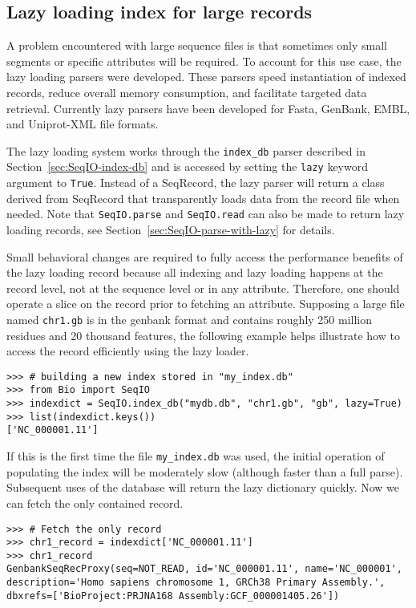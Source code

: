 \documentclass{report}
\begin{document}
\subsection{Lazy loading index for large records}
\label{sec:SeqIO-lazy-index}

A problem encountered with large sequence files is that sometimes only
small segments or specific attributes will be required. To account for
this use case, the lazy loading parsers were developed. These parsers
speed instantiation of indexed records, reduce overall memory consumption,
and facilitate targeted data retrieval. Currently lazy parsers have been
developed for Fasta, GenBank, EMBL, and Uniprot-XML file formats.

The lazy loading system works through the \verb|index_db| parser described
in Section~\ref{sec:SeqIO-index-db} and is accessed by setting the
\verb|lazy| keyword argument to \verb|True|. Instead of a SeqRecord, the lazy
parser will return a class derived from SeqRecord that transparently loads data
from the record file when needed. Note that \verb|SeqIO.parse| and
\verb|SeqIO.read| can also be made to return lazy loading records, see
Section~\ref{sec:SeqIO-parse-with-lazy} for details.

Small behavioral changes are required to fully access the performance benefits
of the lazy loading record because all indexing and lazy loading happens at
the record level, not at the sequence level or in any attribute. Therefore, one
should operate a slice on the record prior to fetching an attribute. Supposing
a large file named \verb|chr1.gb| is in the genbank format and contains
roughly 250 million residues and 20 thousand features, the following example
helps illustrate how to access the record efficiently using the lazy loader.

\begin{verbatim}
>>> # building a new index stored in "my_index.db"
>>> from Bio import SeqIO
>>> indexdict = SeqIO.index_db("mydb.db", "chr1.gb", "gb", lazy=True)
>>> list(indexdict.keys())
['NC_000001.11']
\end{verbatim}

If this is the first time the file \verb|my_index.db| was used, the initial
operation of populating the index will be moderately slow (although faster than
a full parse). Subsequent uses of the database will return the lazy dictionary
quickly. Now we can fetch the only contained record.

\begin{verbatim}
>>> # Fetch the only record
>>> chr1_record = indexdict['NC_000001.11']
>>> chr1_record
GenbankSeqRecProxy(seq=NOT_READ, id='NC_000001.11', name='NC_000001',
description='Homo sapiens chromosome 1, GRCh38 Primary Assembly.',
dbxrefs=['BioProject:PRJNA168 Assembly:GCF_000001405.26'])
\end{verbatim}
\end{document}
